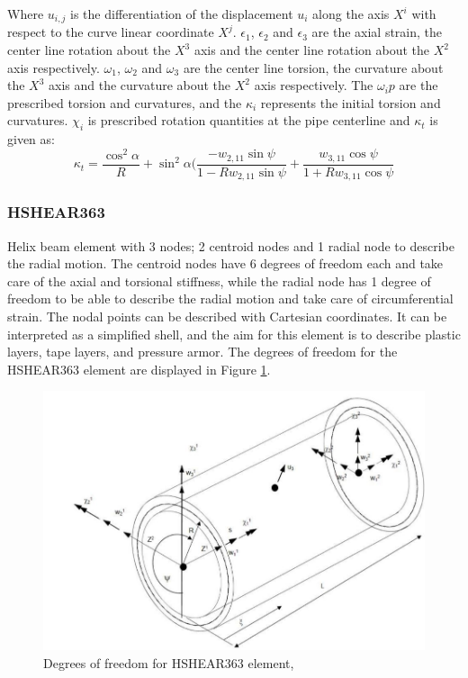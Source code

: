 \noindent Where $u_{i,j}$ is the differentiation of the displacement $u_i$ along the axis $X^i$ with respect to the curve linear coordinate $X^j$. $\epsilon_1$, $\epsilon_2$ and $\epsilon_3$ are the axial strain, the center line rotation about the $X^3$ axis and the center line rotation about the $X^2$ axis respectively. $\omega_1$, $\omega_2$ and $\omega_3$ are the center line torsion, the curvature about the $X^3$ axis and the curvature about the $X^2$ axis respectively. The $\omega_ip$ are the prescribed torsion and curvatures, and the $\kappa_i$ represents the initial torsion and curvatures. $\chi_i$ is prescribed rotation quantities at the pipe centerline and $\kappa_t$ is given as:
\begin{equation}
    \kappa_t=\frac{\cos^2\alpha}{R}+\sin^2 \alpha (\frac{-w_{2,11}\sin \psi }{1-R w_{2,11} \sin \psi} + \frac{w_{3,11}\cos \psi }{1+R w_{3,11} \cos \psi}
\end{equation}

\subsubsection{HSHEAR363}
Helix beam element with 3 nodes; 2 centroid nodes and 1 radial node to describe the radial motion. The centroid nodes have 6 degrees of freedom each and take care of the axial and torsional stiffness, while the radial node has 1 degree of freedom to be able to describe the radial motion and take care of circumferential strain.  The nodal points can be described with Cartesian coordinates. It can be interpreted as a simplified shell, and the aim for this element is to describe plastic layers, tape layers, and pressure armor. The degrees of freedom for the HSHEAR363 element are displayed in Figure \ref{fig:363}. 

\begin{figure}[H]
\centering
\includegraphics[scale=0.5]{figures/hshear363}
\caption[$\; \:$HSHEAR363]{Degrees of freedom for HSHEAR363 element, \cite{Bflextheory2013} }
 \label{fig:363}
\end{figure}

